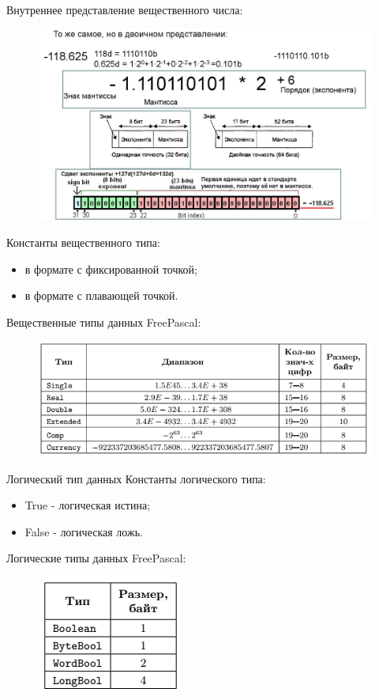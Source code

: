 \documentclass{beamer}
\begin{document}
\begin{frame}
Внутреннее представление вещественного числа:
\begin{figure}[h]
\centering
\includegraphics[scale=0.7]{images/lec02-pic09.png}
\end{figure}
\end{frame} 

\begin{frame}
Константы вещественного типа:
\begin{itemize}
\item в формате с фиксированной точкой;
\item в формате с плавающей точкой.
\end{itemize}
Вещественные типы данных FreePascal:
\begin{figure}[h]
\centering
\includegraphics[scale=0.7]{images/lec02-pic08.png}
\end{figure}
\end{frame} 

\begin{frame}{Логический тип данных}
Константы логического типа:
\begin{itemize}
\item True - логическая истина;
\item False - логическая ложь.
\end{itemize}
Логические типы данных FreePascal:
\begin{figure}[h]
\centering
\includegraphics[scale=0.75]{images/lec02-pic10.png}
\end{figure}
\end{frame} 
\end{document}
